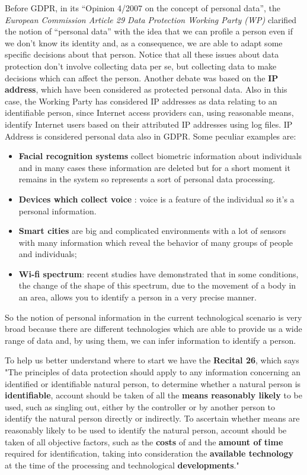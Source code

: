 Before GDPR, in its “Opinion 4/2007 on the concept of personal data”, the \textit{European Commission Article 29 Data Protection Working Party (WP)} clarified the notion of “personal data” with the idea that we can profile a person even if we don’t know its identity and, as a consequence, we are able to adapt some specific decisions about that person. Notice that all these issues about data protection don’t involve collecting data per se, but collecting data to make decisions which can affect the person.
Another debate was based on the \textbf{IP address}, which have been considered as protected personal data. Also in this case, the Working Party has considered IP addresses as data relating to an identifiable person, since Internet access providers can, using reasonable means, identify Internet users based on their attributed IP addresses using log files. IP Address is considered personal data also in GDPR.
Some peculiar examples are:
\begin{itemize}
    \item \textbf{Facial recognition systems} collect biometric information about individuals and in many cases these information are deleted but for a short moment it remains in the system so represents a sort of personal data processing.
    \item \textbf{Devices which collect voice} : voice is a feature of the individual so it’s a personal information.
    \item \textbf{Smart cities} are big and complicated environments with a lot of sensors with many information which reveal the behavior of many groups of people and individuals;
    \item \textbf{Wi-fi spectrum}: recent studies have demonstrated that in some conditions, the change of the shape of this spectrum, due to the movement of a body in an area, allows you to identify a person in a very precise manner.
\end{itemize}
So the notion of personal information in the current technological scenario is very broad because there are different technologies which are able to provide us a wide range of data and, by using them, we can infer information to identify a person.

To help us better understand where to start we have the \textbf{Recital 26}, which says "The principles of data protection should apply to any information concerning an identified or identifiable natural person, to determine whether a natural person is \textbf{identifiable}, account should be taken of all the \textbf{means reasonably likely} to be used, such as singling out, either by the controller or by another person to identify the natural person directly or indirectly. To ascertain whether means are reasonably likely to be used to identify the natural person, account should be taken of all objective factors, such as the \textbf{costs} of and the \textbf{amount of time} required for identification, taking into consideration the \textbf{available technology} at the time of the processing and technological \textbf{developments}."

